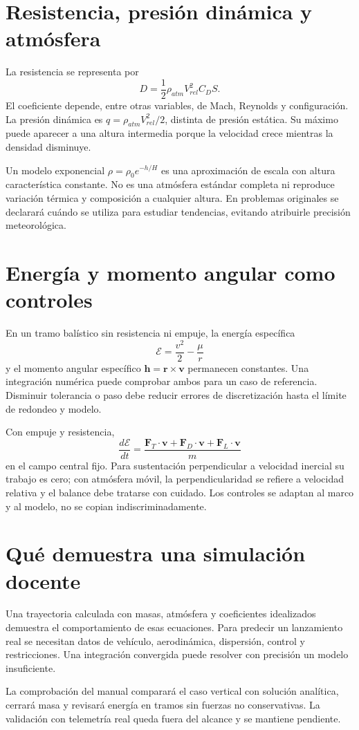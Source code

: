 \section{Resistencia, presión dinámica y atmósfera}
La resistencia se representa por
\[
 D=\frac12\rho_{atm}V_{rel}^2C_D S.
\]
El coeficiente depende, entre otras variables, de Mach, Reynolds y configuración. La presión dinámica es $q=\rho_{atm}V_{rel}^2/2$, distinta de presión estática. Su máximo puede aparecer a una altura intermedia porque la velocidad crece mientras la densidad disminuye.

Un modelo exponencial $\rho=\rho_0e^{-h/H}$ es una aproximación de escala con altura característica constante. No es una atmósfera estándar completa ni reproduce variación térmica y composición a cualquier altura. En problemas originales se declarará cuándo se utiliza para estudiar tendencias, evitando atribuirle precisión meteorológica.
\section{Energía y momento angular como controles}
En un tramo balístico sin resistencia ni empuje, la energía específica
\[
 \mathcal E=\frac{v^2}{2}-\frac{\mu}{r}
\]
y el momento angular específico $\mathbf h=\mathbf r\times\mathbf v$ permanecen constantes. Una integración numérica puede comprobar ambos para un caso de referencia. Disminuir tolerancia o paso debe reducir errores de discretización hasta el límite de redondeo y modelo.

Con empuje y resistencia,
\[
 \frac{d\mathcal E}{dt}=\frac{\mathbf F_T\cdot\mathbf v+\mathbf F_D\cdot\mathbf v+\mathbf F_L\cdot\mathbf v}{m}
\]
en el campo central fijo. Para sustentación perpendicular a velocidad inercial su trabajo es cero; con atmósfera móvil, la perpendicularidad se refiere a velocidad relativa y el balance debe tratarse con cuidado. Los controles se adaptan al marco y al modelo, no se copian indiscriminadamente.
\section{Qué demuestra una simulación docente}
Una trayectoria calculada con masas, atmósfera y coeficientes idealizados demuestra el comportamiento de esas ecuaciones. Para predecir un lanzamiento real se necesitan datos de vehículo, aerodinámica, dispersión, control y restricciones. Una integración convergida puede resolver con precisión un modelo insuficiente.

La comprobación del manual comparará el caso vertical con solución analítica, cerrará masa y revisará energía en tramos sin fuerzas no conservativas. La validación con telemetría real queda fuera del alcance y se mantiene pendiente.

